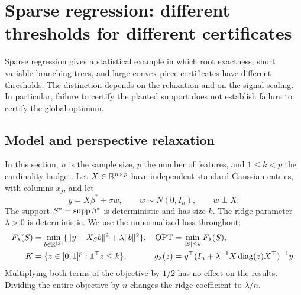 \section{Sparse regression: different thresholds for different certificates}
\label{sec:regression}

Sparse regression gives a statistical example in which root exactness,
short variable-branching trees, and large convex-piece certificates have
different thresholds. The distinction depends on the relaxation and on the
signal scaling. In particular, failure to certify the planted support does
not establish failure to certify the global optimum.

\subsection{Model and perspective relaxation}
\label{regression:model}

In this section, $n$ is the sample size, $p$ the number of features, and
$1\leq k<p$ the cardinality budget. Let $X\in\mathbb{R}^{n\times p}$ have independent
standard Gaussian entries, with columns $x_j$, and let
\begin{equation}\label{regression:model-eq}
 y=X\beta^*+\sigma w,\qquad w\sim N(0,I_n),\qquad w\perp X.
\end{equation}
The support $S^*=\operatorname{supp}\beta^*$ is deterministic and has size $k$.
The ridge parameter $\lambda>0$ is deterministic. We use the unnormalized
loss throughout:
\begin{align}
 F_\lambda(S)&=\min_{b\in\mathbb{R}^{|S|}}
       \{\|y-X_Sb\|^2+\lambda\|b\|^2\},
       &\operatorname{OPT}&=\min_{|S|\leq k}F_\lambda(S),\label{regression:integer}\\
 K&=\{z\in[0,1]^p:\mathbf1^\top z\leq k\},
       &g_\lambda(z)&=y^\top
       (I_n+\lambda^{-1}X\operatorname{diag}(z)X^\top)^{-1}y.
       \label{regression:perspective}
\end{align}
Multiplying both terms of the objective by $1/2$ has no effect on the
results. Dividing the entire objective by $n$ changes the ridge coefficient
to $\lambda/n$.

